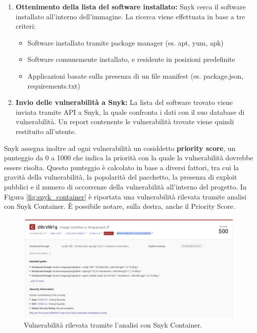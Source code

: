 \begin{itemize}
\begin{enumerate}
            \item \textbf{Ottenimento della lista del software installato:} Snyk cerca il software installato all'interno dell'immagine. La ricerca viene effettuata in base a tre criteri:
                  \begin{itemize}
                     \item Software installato tramite package manager (es. apt, yum, apk)
                     \item Software comunemente installato, e residente in posizioni predefinite
                     \item Applicazioni basate sulla presenza di un file manifest (es. package.json, requirements.txt)
                  \end{itemize}
            \item \textbf{Invio delle vulnerabilità a Snyk:} La lista del software trovato viene inviata tramite API a Snyk, la quale confronta i dati con il suo database di vulnerabilità. Un report contenente le vulnerabilità trovate viene quindi restituito all'utente.
         \end{enumerate}
         Snyk assegna inoltre ad ogni vulnerabilità un cosiddetto \textbf{priority score}, un punteggio da 0 a 1000 che indica la priorità con la quale la vulnerabilità dovrebbe essere risolta. Questo punteggio è calcolato in base a diversi fattori, tra cui la gravità della vulnerabilità, la popolarità del pacchetto, la presenza di exploit pubblici e il numero di occorrenze della vulnerabilità all'interno del progetto.
         In Figura \ref{fig:snyk_container} è riportata una vulnerabilità rilevata tramite analisi con Snyk Container. È possibile notare, sulla destra, anche il Priority Score.
         \begin{figure}[H]
            \centering
            \includegraphics[width=1\textwidth]{immagini/capitolo1/snyk_container.png}
            \caption{Vulnerabilità rilevata tramite l'analisi con Snyk Container.}

\end{figure}
\end{itemize}
